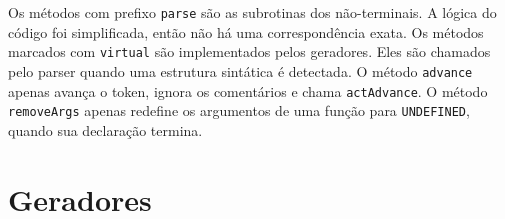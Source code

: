 \documentclass[10pt,a4paper]{article}
\begin{document}
Os métodos com prefixo \texttt{parse} são as subrotinas dos não-terminais.
A lógica do código foi simplificada, então não há uma correspondência exata.
Os métodos marcados com \texttt{virtual} são implementados pelos geradores.
Eles são chamados pelo parser quando uma estrutura sintática é detectada.
O método \texttt{advance} apenas avança o token, ignora os comentários e chama \texttt{actAdvance}.
O método \texttt{removeArgs} apenas redefine os argumentos de uma função para \texttt{UNDEFINED}, quando sua declaração termina.
\section{Geradores}
\end{document}
